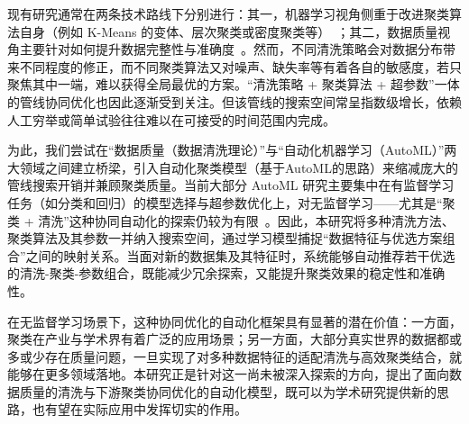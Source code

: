 \documentclass[8pt]{article} %
\numberwithin{equation}{section}
\begin{document}
现有研究通常在两条技术路线下分别进行：其一，机器学习视角侧重于改进聚类算法自身（例如 K-Means 的变体、层次聚类或密度聚类等）~\cite{ref8, ref9, ref10}；其二，数据质量视角主要针对如何提升数据完整性与准确度~\cite{ref11, ref12}。然而，不同清洗策略会对数据分布带来不同程度的修正，而不同聚类算法又对噪声、缺失率等有着各自的敏感度，若只聚焦其中一端，难以获得全局最优的方案。“清洗策略 + 聚类算法 + 超参数”一体的管线协同优化也因此逐渐受到关注。但该管线的搜索空间常呈指数级增长，依赖人工穷举或简单试验往往难以在可接受的时间范围内完成。

为此，我们尝试在“数据质量（数据清洗理论）”与“自动化机器学习（AutoML）”两大领域之间建立桥梁，引入自动化聚类模型（基于AutoML的思路）来缩减庞大的管线搜索开销并兼顾聚类质量。当前大部分 AutoML 研究主要集中在有监督学习任务（如分类和回归）的模型选择与超参数优化上，对无监督学习——尤其是“聚类 + 清洗”这种协同自动化的探索仍较为有限~\cite{ref13, ref14}。因此，本研究将多种清洗方法、聚类算法及其参数一并纳入搜索空间，通过学习模型捕捉“数据特征与优选方案组合”之间的映射关系。当面对新的数据集及其特征时，系统能够自动推荐若干优选的清洗-聚类-参数组合，既能减少冗余探索，又能提升聚类效果的稳定性和准确性。

在无监督学习场景下，这种协同优化的自动化框架具有显著的潜在价值：一方面，聚类在产业与学术界有着广泛的应用场景；另一方面，大部分真实世界的数据都或多或少存在质量问题，一旦实现了对多种数据特征的适配清洗与高效聚类结合，就能够在更多领域落地。本研究正是针对这一尚未被深入探索的方向，提出了面向数据质量的清洗与下游聚类协同优化的自动化模型，既可以为学术研究提供新的思路，也有望在实际应用中发挥切实的作用。
\end{document}
